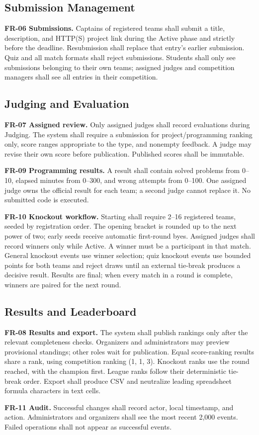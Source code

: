 \documentclass[12pt]{article}
\begin{document}
\subsection{Submission Management}
\textbf{FR-06 Submissions.} Captains of registered teams shall submit a title, description, and HTTP(S) project link during the Active phase and strictly before the deadline. Resubmission shall replace that entry's earlier submission. Quiz and all match formats shall reject submissions. Students shall only see submissions belonging to their own teams; assigned judges and competition managers shall see all entries in their competition.
\subsection{Judging and Evaluation}
\textbf{FR-07 Assigned review.} Only assigned judges shall record evaluations during Judging. The system shall require a submission for project/programming ranking only, score ranges appropriate to the type, and nonempty feedback. A judge may revise their own score before publication. Published scores shall be immutable.\par
\textbf{FR-09 Programming results.} A result shall contain solved problems from 0--10, elapsed minutes from 0--300, and wrong attempts from 0--100. One assigned judge owns the official result for each team; a second judge cannot replace it. No submitted code is executed.\par
\textbf{FR-10 Knockout workflow.} Starting shall require 2--16 registered teams, seeded by registration order. The opening bracket is rounded up to the next power of two; early seeds receive automatic first-round byes. Assigned judges shall record winners only while Active. A winner must be a participant in that match. General knockout events use winner selection; quiz knockout events use bounded points for both teams and reject draws until an external tie-break produces a decisive result. Results are final; when every match in a round is complete, winners are paired for the next round.
\subsection{Results and Leaderboard}
\textbf{FR-08 Results and export.} The system shall publish rankings only after the relevant completeness checks. Organizers and administrators may preview provisional standings; other roles wait for publication. Equal score-ranking results share a rank, using competition ranking (1, 1, 3). Knockout ranks use the round reached, with the champion first. League ranks follow their deterministic tie-break order. Export shall produce CSV and neutralize leading spreadsheet formula characters in text cells.\par
\textbf{FR-11 Audit.} Successful changes shall record actor, local timestamp, and action. Administrators and organizers shall see the most recent 2,000 events. Failed operations shall not appear as successful events.
\end{document}

